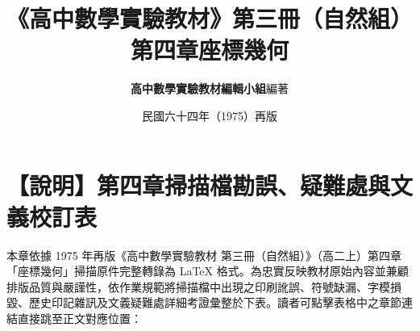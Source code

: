 \documentclass[a4paper,12pt,twoside]{article}
\title{\LARGE\textbf{《高中數學實驗教材》第三冊（自然組）}\\[0.5em] \Large\textbf{第四章\quad 座標幾何}}
\author{\textbf{高中數學實驗教材編輯小組}\quad 編著}
\date{民國六十四年（1975）再版}
\begin{document}
\maketitle
\thispagestyle{firstpage}

\section*{【說明】第四章掃描檔勘誤、疑難處與文義校訂表}
\label{sec:errata_notes_b3_ch4}\label{sec:current_errata}

本章依據 1975 年再版《高中數學實驗教材 第三冊（自然組）》（高二上）第四章「座標幾何」掃描原件完整轉錄為 \LaTeX{} 格式。為忠實反映教材原始內容並兼顧排版品質與嚴謹性，依作業規範將掃描檔中出現之印刷訛誤、符號缺漏、字模損毀、歷史印記雜訊及文義疑難處詳細考證彙整於下表。讀者可點擊表格中之章節連結直接跳至正文對應位置：
\end{document}
